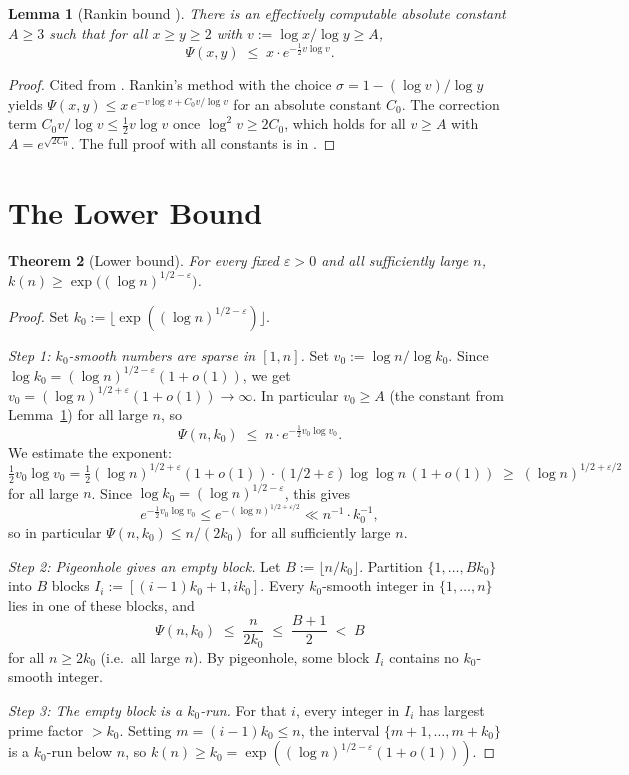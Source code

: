 \documentclass[12pt]{article}
\newtheorem{theorem}{Theorem}
\newtheorem{lemma}[theorem]{Lemma}
\theoremstyle{definition}
\begin{document}
\begin{lemma}[Rankin bound {\cite[Theorem~III.5.1]{Ten}}]\label{lem:rankin}
There is an effectively computable absolute constant $A \geq 3$ such that
for all $x \geq y \geq 2$ with $v := \log x / \log y \geq A$,
\[
  \Psi(x, y) \;\leq\; x \cdot e^{-\frac{1}{2}v\log v}.
\]
\end{lemma}
\begin{proof}
Cited from \cite[Theorem~III.5.1]{Ten}.
Rankin's method with the choice $\sigma = 1 - (\log v)/\log y$ yields
$\Psi(x,y) \leq x\,e^{-v\log v + C_0 v/\log v}$ for an absolute constant $C_0$.
The correction term $C_0 v/\log v \leq \frac{1}{2}v\log v$ once $\log^2 v \geq 2C_0$,
which holds for all $v \geq A$ with $A = e^{\sqrt{2C_0}}$.
The full proof with all constants is in \cite[Theorem~III.5.1]{Ten}.
\end{proof}

\section{The Lower Bound}

\begin{theorem}[Lower bound]\label{thm:lower}
For every fixed $\varepsilon > 0$ and all sufficiently large $n$,
$k(n) \geq \exp\!\bigl((\log n)^{1/2-\varepsilon}\bigr)$.
\end{theorem}

\begin{proof}
Set $k_0 := \lfloor\exp((\log n)^{1/2-\varepsilon})\rfloor$.

\medskip
\noindent\textit{Step 1: $k_0$-smooth numbers are sparse in $[1,n]$.}
Set $v_0 := \log n / \log k_0$.
Since $\log k_0 = (\log n)^{1/2-\varepsilon}(1+o(1))$,
we get $v_0 = (\log n)^{1/2+\varepsilon}(1+o(1)) \to \infty$.
In particular $v_0 \geq A$ (the constant from Lemma~\ref{lem:rankin})
for all large $n$, so
\[
  \Psi(n, k_0) \;\leq\; n \cdot e^{-\frac{1}{2}v_0 \log v_0}.
\]
We estimate the exponent:
\[
  \tfrac{1}{2}v_0 \log v_0
  = \tfrac{1}{2}(\log n)^{1/2+\varepsilon}(1+o(1)) \cdot (1/2+\varepsilon)\log\log n\,(1+o(1))
  \;\geq\; (\log n)^{1/2+\varepsilon/2}
\]
for all large $n$.  Since $\log k_0 = (\log n)^{1/2-\varepsilon}$, this gives
\[
  e^{-\frac{1}{2}v_0\log v_0} \leq e^{-(\log n)^{1/2+\varepsilon/2}} \ll n^{-1} \cdot k_0^{-1},
\]
so in particular $\Psi(n, k_0) \leq n/(2k_0)$ for all sufficiently large $n$.

\medskip
\noindent\textit{Step 2: Pigeonhole gives an empty block.}
Let $B := \lfloor n/k_0 \rfloor$.
Partition $\{1, \ldots, B k_0\}$ into $B$ blocks $I_i := [(i-1)k_0+1, ik_0]$.
Every $k_0$-smooth integer in $\{1,\ldots,n\}$ lies in one of these blocks, and
\[
  \Psi(n, k_0) \;\leq\; \frac{n}{2k_0} \;\leq\; \frac{B+1}{2} \;<\; B
\]
for all $n \geq 2k_0$ (i.e.\ all large $n$).  By pigeonhole,
some block $I_i$ contains no $k_0$-smooth integer.

\medskip
\noindent\textit{Step 3: The empty block is a $k_0$-run.}
For that $i$, every integer in $I_i$ has largest prime factor $> k_0$.
Setting $m = (i-1)k_0 \leq n$, the interval $\{m+1,\ldots,m+k_0\}$
is a $k_0$-run below $n$, so
$k(n) \geq k_0 = \exp((\log n)^{1/2-\varepsilon}(1+o(1)))$.
\end{proof}
\end{document}
